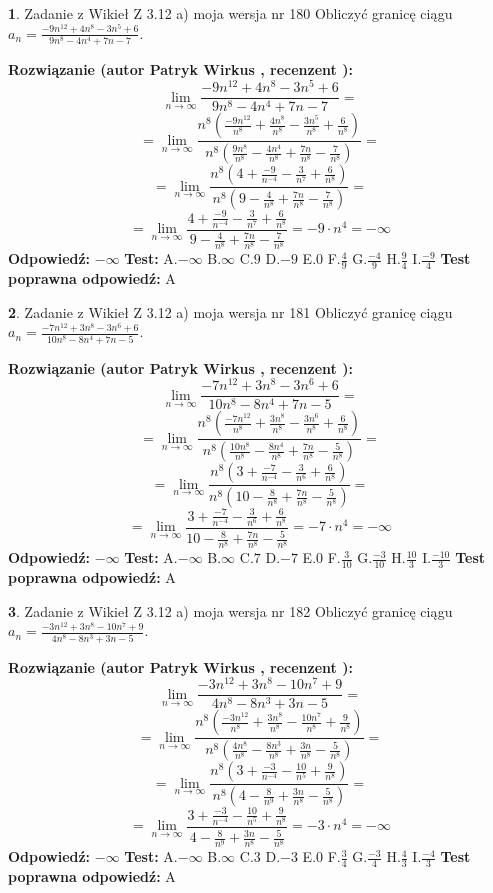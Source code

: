 \documentclass[12pt, a4paper]{article}
\theoremstyle{definition} %
\newtheorem{zad}{}
\newcommand{\zadStart}[1]{\begin{zad}#1\newline}
\newcommand{\zadStop}{\end{zad}}
\newcommand{\rozwStart}[2]{\noindent \textbf{Rozwiązanie (autor #1 , recenzent #2): }\newline}
\newcommand{\rozwStop}{\newline}
\newcommand{\odpStart}{\noindent \textbf{Odpowiedź:}\newline}
\newcommand{\odpStop}{\newline}
\newcommand{\testStart}{\noindent \textbf{Test:}\newline}
\newcommand{\testStop}{\newline}
\newcommand{\kluczStart}{\noindent \textbf{Test poprawna odpowiedź:}\newline}
\newcommand{\kluczStop}{\newline}
\begin{document}
\zadStart{Zadanie z Wikieł Z 3.12 a) moja wersja nr 180}
Obliczyć granicę ciągu $a_{n}=\frac{-9n^{12}+4n^{8}-3n^{5}+6}{9n^{8}-4n^{4}+7n-7}$.
\zadStop
\rozwStart{Patryk Wirkus}{}
$$\lim\limits_{n\to\infty}\frac{-9n^{12}+4n^{8}-3n^{5}+6}{9n^{8}-4n^{4}+7n-7}=$$
$$=\lim\limits_{n\to\infty}\frac{n^{8}\left(\frac{-9n^{12}}{n^{8}}+\frac{4n^{8}}{n^{8}}-\frac{3n^{5}}{n^{8}}+\frac{6}{n^{8}}\right)}{n^{8}\left(\frac{9n^{8}}{n^{8}}-\frac{4n^{4}}{n^{8}}+\frac{7n}{n^{8}}-\frac{7}{n^{8}}\right)}=$$
$$=\lim\limits_{n\to\infty}\frac{n^{8}\left(4+\frac{-9}{n^{-4}}-\frac{3}{n^{7}}+\frac{6}{n^{8}}\right)}
{n^{8}\left(9-\frac{4}{n^{8}}+\frac{7n}{n^{8}}-\frac{7}{n^{8}}\right)}=$$
$$=\lim\limits_{n\to\infty}\frac{4+\frac{-9}{n^{-4}}-\frac{3}{n^{7}}+\frac{6}{n^{8}}}{9-\frac{4}{n^{8}}+\frac{7n}{n^{8}}-\frac{7}{n^{8}}}=-9\cdot n^{4} = -\infty$$
\rozwStop
\odpStart
$-\infty$
\odpStop
\testStart
A.$-\infty$
B.$\infty$
C.$9$
D.$-9$
E.$0$
F.$\frac{4}{9}$
G.$\frac{-4}{9}$
H.$\frac{9}{4}$
I.$\frac{-9}{4}$
\testStop
\kluczStart
A
\kluczStop



\zadStart{Zadanie z Wikieł Z 3.12 a) moja wersja nr 181}
Obliczyć granicę ciągu $a_{n}=\frac{-7n^{12}+3n^{8}-3n^{6}+6}{10n^{8}-8n^{4}+7n-5}$.
\zadStop
\rozwStart{Patryk Wirkus}{}
$$\lim\limits_{n\to\infty}\frac{-7n^{12}+3n^{8}-3n^{6}+6}{10n^{8}-8n^{4}+7n-5}=$$
$$=\lim\limits_{n\to\infty}\frac{n^{8}\left(\frac{-7n^{12}}{n^{8}}+\frac{3n^{8}}{n^{8}}-\frac{3n^{6}}{n^{8}}+\frac{6}{n^{8}}\right)}{n^{8}\left(\frac{10n^{8}}{n^{8}}-\frac{8n^{4}}{n^{8}}+\frac{7n}{n^{8}}-\frac{5}{n^{8}}\right)}=$$
$$=\lim\limits_{n\to\infty}\frac{n^{8}\left(3+\frac{-7}{n^{-4}}-\frac{3}{n^{6}}+\frac{6}{n^{8}}\right)}
{n^{8}\left(10-\frac{8}{n^{8}}+\frac{7n}{n^{8}}-\frac{5}{n^{8}}\right)}=$$
$$=\lim\limits_{n\to\infty}\frac{3+\frac{-7}{n^{-4}}-\frac{3}{n^{6}}+\frac{6}{n^{8}}}{10-\frac{8}{n^{8}}+\frac{7n}{n^{8}}-\frac{5}{n^{8}}}=-7\cdot n^{4} = -\infty$$
\rozwStop
\odpStart
$-\infty$
\odpStop
\testStart
A.$-\infty$
B.$\infty$
C.$7$
D.$-7$
E.$0$
F.$\frac{3}{10}$
G.$\frac{-3}{10}$
H.$\frac{10}{3}$
I.$\frac{-10}{3}$
\testStop
\kluczStart
A
\kluczStop



\zadStart{Zadanie z Wikieł Z 3.12 a) moja wersja nr 182}
Obliczyć granicę ciągu $a_{n}=\frac{-3n^{12}+3n^{8}-10n^{7}+9}{4n^{8}-8n^{3}+3n-5}$.
\zadStop
\rozwStart{Patryk Wirkus}{}
$$\lim\limits_{n\to\infty}\frac{-3n^{12}+3n^{8}-10n^{7}+9}{4n^{8}-8n^{3}+3n-5}=$$
$$=\lim\limits_{n\to\infty}\frac{n^{8}\left(\frac{-3n^{12}}{n^{8}}+\frac{3n^{8}}{n^{8}}-\frac{10n^{7}}{n^{8}}+\frac{9}{n^{8}}\right)}{n^{8}\left(\frac{4n^{8}}{n^{8}}-\frac{8n^{3}}{n^{8}}+\frac{3n}{n^{8}}-\frac{5}{n^{8}}\right)}=$$
$$=\lim\limits_{n\to\infty}\frac{n^{8}\left(3+\frac{-3}{n^{-4}}-\frac{10}{n^{5}}+\frac{9}{n^{8}}\right)}
{n^{8}\left(4-\frac{8}{n^{9}}+\frac{3n}{n^{8}}-\frac{5}{n^{8}}\right)}=$$
$$=\lim\limits_{n\to\infty}\frac{3+\frac{-3}{n^{-4}}-\frac{10}{n^{5}}+\frac{9}{n^{8}}}{4-\frac{8}{n^{9}}+\frac{3n}{n^{8}}-\frac{5}{n^{8}}}=-3\cdot n^{4} = -\infty$$
\rozwStop
\odpStart
$-\infty$
\odpStop
\testStart
A.$-\infty$
B.$\infty$
C.$3$
D.$-3$
E.$0$
F.$\frac{3}{4}$
G.$\frac{-3}{4}$
H.$\frac{4}{3}$
I.$\frac{-4}{3}$
\testStop
\kluczStart
A
\kluczStop
\end{document}
